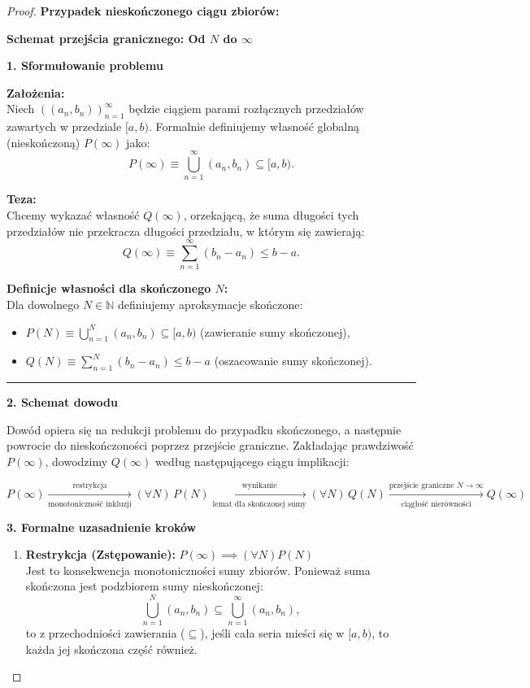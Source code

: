 \begin{proof}
	\noindent \textbf{Przypadek nieskończonego ciągu zbiorów:} 


\textbf{Schemat przejścia granicznego: Od $N$ do $\infty$}

\textbf{1. Sformułowanie problemu}

\textbf{Założenia:} \\
Niech $\left( (a_n, b_n) \right)_{n=1}^{\infty}$ będzie ciągiem parami rozłącznych przedziałów zawartych w przedziale $[a, b)$. Formalnie definiujemy własność globalną (nieskończoną) $P(\infty)$ jako:
\[
    P(\infty) \equiv \bigcup_{n=1}^{\infty} (a_n, b_n) \subseteq [a, b).
\]

\textbf{Teza:} \\
Chcemy wykazać własność $Q(\infty)$, orzekającą, że suma długości tych przedziałów nie przekracza długości przedziału, w którym się zawierają:
\[
    Q(\infty) \equiv \sum_{n=1}^{\infty} (b_n - a_n) \le b - a.
\]

\textbf{Definicje własności dla skończonego $N$:} \\
Dla dowolnego $N \in \mathbb{N}$ definiujemy aproksymacje skończone:
\begin{itemize}
    \item $P(N) \equiv \bigcup_{n=1}^{N} (a_n, b_n) \subseteq [a, b)$ \quad (zawieranie sumy skończonej),
    \item $Q(N) \equiv \sum_{n=1}^{N} (b_n - a_n) \le b - a$ \quad (oszacowanie sumy skończonej).
\end{itemize}

\hrule
\vspace{0.5cm}

\textbf{2. Schemat dowodu}

Dowód opiera się na redukcji problemu do przypadku skończonego, a następnie powrocie do nieskończoności poprzez przejście graniczne. Zakładając prawdziwość $P(\infty)$, dowodzimy $Q(\infty)$ według następującego ciągu implikacji:

\[
    P(\infty)
    \xrightarrow[\text{monotoniczność inkluzji}]{\text{restrykcja}}
    (\forall N)\, P(N)
    \xrightarrow[\text{lemat dla skończonej sumy}]{\text{wynikanie}}
    (\forall N)\, Q(N)
    \xrightarrow[\text{ciągłość nierówności}]{\text{przejście graniczne } N \to \infty}
    Q(\infty)
\]

\textbf{3. Formalne uzasadnienie kroków}

\begin{enumerate}
    \item \textbf{Restrykcja (Zstępowanie):} \quad $P(\infty) \implies (\forall N) P(N)$ \\
    Jest to konsekwencja monotoniczności sumy zbiorów. Ponieważ suma skończona jest podzbiorem sumy nieskończonej:
    \[
        \bigcup_{n=1}^{N} (a_n, b_n) \subseteq \bigcup_{n=1}^{\infty} (a_n, b_n),
    \]
    to z przechodniości zawierania ($\subseteq$), jeśli cała seria mieści się w $[a, b)$, to każda jej skończona część również.


\end{enumerate}
\end{proof}
